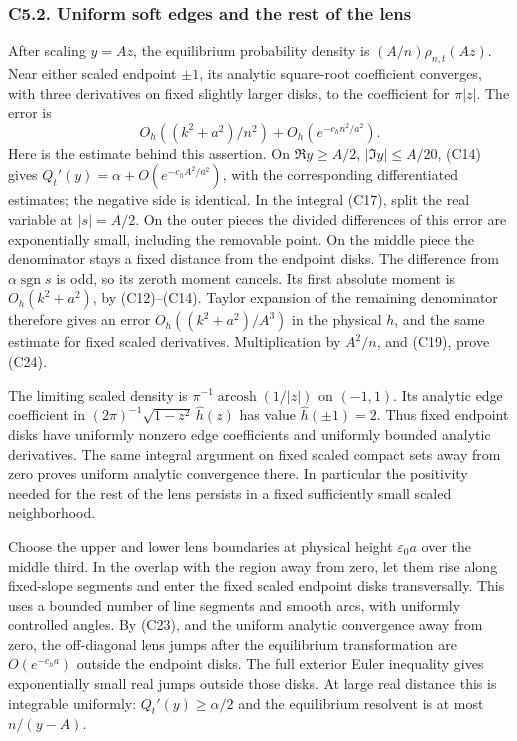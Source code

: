 \documentclass[
  11pt,
]{article}
\begin{document}
\subsubsection{C5.2. Uniform soft edges and the rest of the
lens}\label{c5.2.-uniform-soft-edges-and-the-rest-of-the-lens}

After scaling \(y=Az\), the equilibrium probability density is
\((A/n)\rho_{n,t}(Az)\). Near either scaled endpoint \(\pm1\), its
analytic square-root coefficient converges, with three derivatives on
fixed slightly larger disks, to the coefficient for \(\pi|z|\). The
error is \[
O_h((k^2+a^2)/n^2)+O_h(e^{-c_hn^2/a^2}).\tag{C24}
\] Here is the estimate behind this assertion. On \(\Re y\ge A/2\),
\(|\Im y|\le A/20\), (C14) gives \(Q_t'(y)=\alpha+O(e^{-c_h A^2/a^2})\),
with the corresponding differentiated estimates; the negative side is
identical. In the integral (C17), split the real variable at
\(|s|=A/2\). On the outer pieces the divided differences of this error
are exponentially small, including the removable point. On the middle
piece the denominator stays a fixed distance from the endpoint disks.
The difference from \(\alpha\operatorname{sgn}s\) is odd, so its zeroth
moment cancels. Its first absolute moment is \(O_h(k^2+a^2)\), by
(C12)--(C14). Taylor expansion of the remaining denominator therefore
gives an error \(O_h((k^2+a^2)/A^3)\) in the physical \(h\), and the
same estimate for fixed scaled derivatives. Multiplication by \(A^2/n\),
and (C19), prove (C24).

The limiting scaled density is \(\pi^{-1}\operatorname{arcosh}(1/|z|)\)
on \((-1,1)\). Its analytic edge coefficient in
\((2\pi)^{-1}\sqrt{1-z^2}\,\widehat h(z)\) has value
\(\widehat h(\pm1)=2\). Thus fixed endpoint disks have uniformly nonzero
edge coefficients and uniformly bounded analytic derivatives. The same
integral argument on fixed scaled compact sets away from zero proves
uniform analytic convergence there. In particular the positivity needed
for the rest of the lens persists in a fixed sufficiently small scaled
neighborhood.

Choose the upper and lower lens boundaries at physical height
\(\varepsilon_0a\) over the middle third. In the overlap with the region
away from zero, let them rise along fixed-slope segments and enter the
fixed scaled endpoint disks transversally. This uses a bounded number of
line segments and smooth arcs, with uniformly controlled angles. By
(C23), and the uniform analytic convergence away from zero, the
off-diagonal lens jumps after the equilibrium transformation are
\(O(e^{-c_ha})\) outside the endpoint disks. The full exterior Euler
inequality gives exponentially small real jumps outside those disks. At
large real distance this is integrable uniformly: \(Q_t'(y)\ge\alpha/2\)
and the equilibrium resolvent is at most \(n/(y-A)\).
\end{document}

